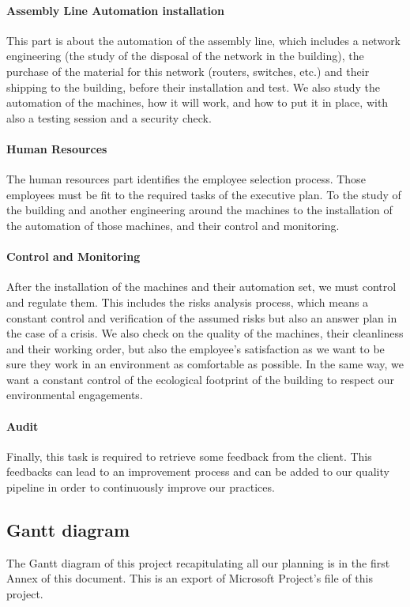 \paragraph{Assembly Line Automation installation} This part is about the automation of the assembly line, which includes a network engineering (the study of the disposal of the network in the building), the purchase
of the material for this network (routers, switches, etc.) and their shipping to the building, before their installation and test. 
We also study the automation of the machines, how it will work, and how to put it in place, with also a testing session and a security check.

\paragraph{Human Resources} The human resources part identifies the employee selection process. Those employees 
must be fit to the required tasks of the executive plan. To the study of the building and another engineering around the machines to the installation of the automation of those machines, and their control and monitoring. 

\paragraph{Control and Monitoring} After the installation of the machines and their automation set, we must control and regulate them.
This includes the risks analysis process, which means a constant control and verification of the assumed risks but also an answer plan in the case of a crisis. 
We also check on the quality of the machines, their cleanliness and their working order, but also the employee's satisfaction as we want to be sure they work in an environment as comfortable as possible. 
In the same way, we want a constant control of the ecological footprint of the building to respect our environmental engagements.   

\paragraph{Audit} Finally, this task is required to retrieve some feedback from the client.
This feedbacks can lead to an improvement process and can be added to our quality pipeline in order to continuously improve our practices.


\subsection{Gantt diagram}

The Gantt diagram of this project recapitulating all our planning is in the first Annex of this document. This is an export of Microsoft Project's file of this project.
